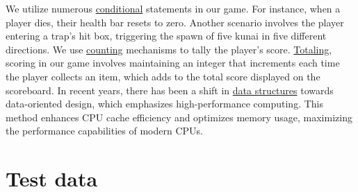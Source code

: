 \documentclass{article}
\begin{document}
We utilize numerous \underline{conditional} statements in our game. For instance, when a player dies, their health bar resets to zero. Another scenario involves the player entering a trap's hit box, triggering the spawn of five kunai in five different directions. We use \underline{counting} mechanisms to tally the player's score. \underline{Totaling}, scoring in our game involves maintaining an integer that increments each time the player collects an item, which adds to the total score displayed on the scoreboard. In recent years, there has been a shift in \underline{data structures} towards data-oriented design, which emphasizes high-performance computing. This method enhances CPU cache efficiency and optimizes memory usage, maximizing the performance capabilities of modern CPUs.

\section{Test data}
\end{document}
